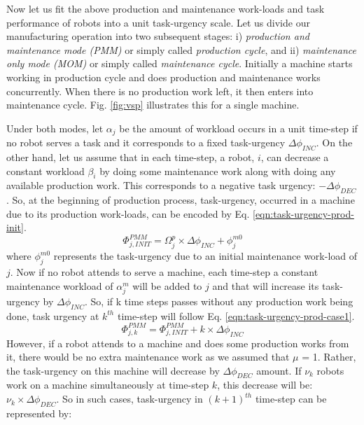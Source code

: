 \documentclass[smallcondensed]{svjour3}
\begin{document}
Now let us fit the above production and maintenance work-loads and task performance of robots into a unit task-urgency scale. Let us divide our manufacturing operation into two subsequent stages: i) {\em production and maintenance mode (PMM)} or simply called {\em production cycle}, and ii) {\em maintenance only mode (MOM)} or simply called {\em maintenance cycle}. Initially a machine starts working in production cycle and does production and maintenance works concurrently. When there is no production work left, it then enters into maintenance cycle. Fig. \ref{fig:vsp} illustrates this for a single machine.

Under both modes, let $\alpha_{j}$ be the amount of workload occurs in a unit time-step if no robot serves a task and it corresponds to a fixed task-urgency $\Delta \phi_{INC}$. On the other hand, let us assume that in each time-step, a robot, $i$, can decrease a constant workload $\beta_{i}$ by doing some maintenance work along with doing any available production work. This  corresponds to a negative task urgency: $- \Delta \phi_{DEC}$. 
So, at the beginning of production process, task-urgency, occurred in a machine due to its production work-loads, can be encoded by Eq. \ref{eqn:task-urgency-prod-init}.
\begin{equation}
\Phi_{j, INIT}^{PMM} = \Omega_{j}^{p} \times \Delta \phi_{INC} + \phi_{j}^{m0}
\label{eqn:task-urgency-prod-init}
\end{equation}
where $\phi_{j}^{m0}$ represents the task-urgency due to an initial maintenance work-load of $j$.
Now if no robot attends to serve a machine, each time-step a constant maintenance workload of $\alpha_{j}^{m}$ will be added to $j$ and that will increase its task-urgency by $\Delta \phi_{INC}$. So, if k time steps passes without any production work being done, task urgency at $k^{th}$ time-step will follow Eq. \ref{eqn:task-urgency-prod-case1}.
\begin{equation}
\Phi_{j, k}^{PMM} =\Phi_{j, INIT}^{PMM} + k \times \Delta \phi_{INC}
\label{eqn:task-urgency-prod-case1}
\end{equation}
However, if a robot attends to a machine and does some production works from it, there would be no extra maintenance work as we assumed that $\mu$ = 1. Rather, the task-urgency on this machine will decrease by $\Delta \phi_{DEC}$ amount. If $\nu_{k}$ robots work on a machine simultaneously at time-step $k$, this decrease will be: $\nu_{k} \times \Delta \phi_{DEC}$. So in such cases, task-urgency in $(k+1)^{th}$ time-step can be represented by:
\end{document}
